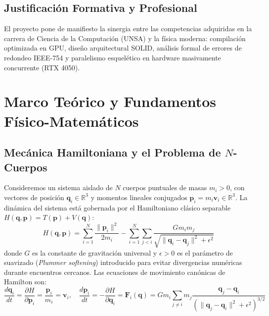 \documentclass[11pt,a4paper]{article}
\begin{document}
\subsection{Justificación Formativa y Profesional}
El proyecto pone de manifiesto la sinergia entre las competencias adquiridas en la carrera de Ciencia de la Computación (UNSA) y la física moderna: compilación optimizada en GPU, diseño arquitectural SOLID, análisis formal de errores de redondeo IEEE-754 y paralelismo esquelético en hardware masivamente concurrente (RTX 4050).

\section{Marco Teórico y Fundamentos Físico-Matemáticos}

\subsection{Mecánica Hamiltoniana y el Problema de $N$-Cuerpos}
Consideremos un sistema aislado de $N$ cuerpos puntuales de masas $m_i > 0$, con vectores de posición $\mathbf{q}_i \in \mathbb{R}^3$ y momentos lineales conjugados $\mathbf{p}_i = m_i \mathbf{v}_i \in \mathbb{R}^3$. La dinámica del sistema está gobernada por el Hamiltoniano clásico separable $H(\mathbf{q}, \mathbf{p}) = T(\mathbf{p}) + V(\mathbf{q})$:
\begin{equation}
    H(\mathbf{q}, \mathbf{p}) = \sum_{i=1}^N \frac{\|\mathbf{p}_i\|^2}{2m_i} - \sum_{i=1}^N \sum_{j < i} \frac{G m_i m_j}{\sqrt{\|\mathbf{q}_i - \mathbf{q}_j\|^2 + \epsilon^2}}
    \label{eq:hamiltonian}
\end{equation}
donde $G$ es la constante de gravitación universal y $\epsilon > 0$ es el parámetro de suavizado (\textit{Plummer softening}) introducido para evitar divergencias numéricas durante encuentros cercanos. Las ecuaciones de movimiento canónicas de Hamilton son:
\begin{equation}
    \frac{d\mathbf{q}_i}{dt} = \frac{\partial H}{\partial \mathbf{p}_i} = \frac{\mathbf{p}_i}{m_i} = \mathbf{v}_i, \quad 
    \frac{d\mathbf{p}_i}{dt} = -\frac{\partial H}{\partial \mathbf{q}_i} = \mathbf{F}_i(\mathbf{q}) = G m_i \sum_{j \neq i} m_j \frac{\mathbf{q}_j - \mathbf{q}_i}{\left(\|\mathbf{q}_j - \mathbf{q}_i\|^2 + \epsilon^2\right)^{3/2}}
    \label{eq:hamilton_eqs}
\end{equation}
\end{document}
